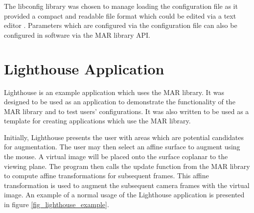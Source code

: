 \documentclass[oneside,11pt]{Latex/Classes/PhDthesisPSnPDF}
\begin{document}
The libconfig library was chosen to manage loading the configuration file as it provided a compact and readable file format which could be edited via a text editor \cite{libconfig_11}.  Parameters which are configured via the configuration file can also be configured in software via the MAR library API.

\section{Lighthouse Application}

Lighthouse is an example application which uses the MAR library.  It was designed to be used as an application to demonstrate the functionality of the MAR library and to test users' configurations.  It was also written to be used as a template for creating applications which use the MAR library.

Initially, Lighthouse presents the user with areas which are potential candidates for augmentation.  The user may then select an affine surface to augment using the mouse.  A virtual image will be placed onto the surface coplanar to the viewing plane.  The program then calls the update function from the MAR library to compute affine transformations for subsequent frames.  This affine transformation is used to augment the subsequent camera frames with the virtual image.  An example of a normal usage of the Lighthouse application is presented in figure \ref{fig_lighthouse_example}.
\end{document}
